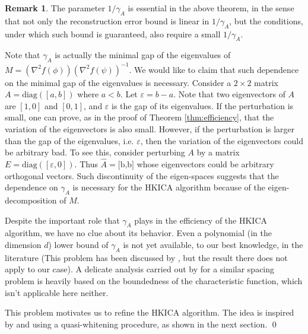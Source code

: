 \documentclass[twoside]{article}
\theoremstyle{definition}
\newtheorem{remark}[lemma]{Remark}
\newcommand{\eps}{\varepsilon}
\begin{document}
\fi
\begin{remark}
The parameter $1/\gamma_A$ is essential in the above theorem, in the sense that not only the reconstruction error bound is linear in $1/\gamma_A$, but the conditions, under which such bound is guaranteed, also require a small $1/\gamma_A$.

Note that $\gamma_A$ is actually the minimal gap of the eigenvalues of $M = (\nabla^2 f(\phi))(\nabla^2f(\psi))^{-1}$.
We would like to claim that such dependence on the minimal gap of the eigenvalues is necessary.
Consider a $2\times 2$ matrix $A = \text{diag}([a,b])$ where $a<b$. Let $\eps = b-a$. Note that two eigenvectors of $A$ are $[1,0]$ and $[0,1]$, and $\eps$ is the gap of its eigenvalues. If the perturbation is small, one can prove, as in the proof of Theorem \ref{thm:efficiency}, that the variation of the eigenvectors is also small. 
However, if the perturbation is larger than the gap of the eigenvalues, i.e. $\eps$, then the variation of the eigenvectors could be arbitrary bad. To see this, consider perturbing $A$ by a matrix $E = \text{diag}([\eps,0])$. Thus $\hat{A} = \text{[b,b]}$ whose eigenvectors could be arbitrary orthogonal vectors.   
Such discontinuity of the eigen-spaces suggests that the dependence on $\gamma_A$ is necessary for the HKICA algorithm because of the eigen-decomposition of $M$. 

Despite the important role that $\gamma_A$ plays in the efficiency of the HKICA algorithm, we have no clue about its behavior. 
Even a polynomial (in the dimension $d$) lower bound of $\gamma_A$ is not yet available, to our best knowledge, in the literature (This problem has been discussed by \citet{husler1987minimal}, but the result there does not apply to our case).
A delicate analysis carried out by \citet{goyal2014fourier} for a similar spacing problem is heavily based on the boundedness of the characteristic function, which isn't applicable here neither. 

This problem motivates us to refine the HKICA algorithm.
The idea is inspired by \citet{arora2012provable} and \citet{frieze1996learning} using a quasi-whitening procedure, as shown in the next section. \qed
\end{remark}
\end{document}
